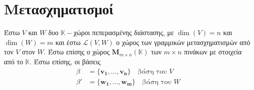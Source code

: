 






\chapter*{Μετασχηματισμοί}







Έστω $V$ και $W$ δυο $ \mathbb{K}- $χώροι πεπερασμένης διάστασης, με 
$ \dim(V) = n $ και $ \dim(W) = m $ και έστω $ \mathcal{L}(V,W) $ ο χώρος των 
γραμμικών μετασχηματισμών από τον $V$ στον $W$. Έστω επίσης ο χώρος 
$ \textbf{M}_{m \times n}(\mathbb{K}) $ των $ m \times n $ πινάκων με στοιχεία από το 
$ \mathbb{K} $. Έστω επίσης, οι βάσεις 
\begin{align*}
  \beta &= \{ \mathbf{v_{1}}, \ldots, \mathbf{v_{n}} \} \quad \text{βάση του $V$} \\
  \beta' &= \{ \mathbf{w_{1}}, \ldots, \mathbf{w_{m}} \} \quad \text{βάση του $W$}
\end{align*} 
